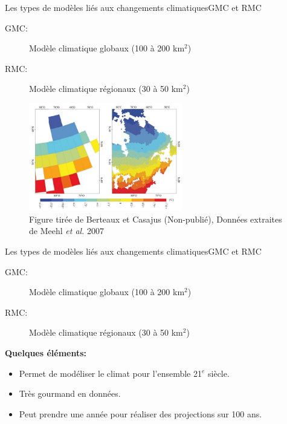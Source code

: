 \documentclass{eecslides}
\begin{document}
	\begin{frame}{Les types de modèles liés aux changements climatiques}{GMC et RMC}
	    
		\begin{description}
			\item [GMC:] Modèle climatique globaux (100 à 200 km$^2$)
			\item [RMC:] Modèle climatique régionaux (30 à 50 km$^2$)
		\end{description}
		\vfill
		\begin{figure}
			\centering
			\includegraphics[width=0.6\textwidth]{RMC.jpg}
	         		\caption*{\scriptsize Figure tirée de Berteaux et Casajus (Non-publié), Données extraites de Meehl \textit{et al.} 2007}
		\end{figure}
	\end{frame}


	\begin{frame}{Les types de modèles liés aux changements climatiques}{GMC et RMC}
	    
		\begin{description}
			\item [GMC:] Modèle climatique globaux (100 à 200 km$^2$)
			\item [RMC:] Modèle climatique régionaux (30 à 50 km$^2$)
		\end{description}
		\vfill
		\textbf{\alert{Quelques éléments:}}
		\begin{itemize}
			\item Permet de modéliser le climat pour l'ensemble 21$^e$ siècle.
			\item Très gourmand en données.
			\item Peut prendre une année pour réaliser des projections sur 100 ans.
		\end{itemize}
	\end{frame}

\end{document}
